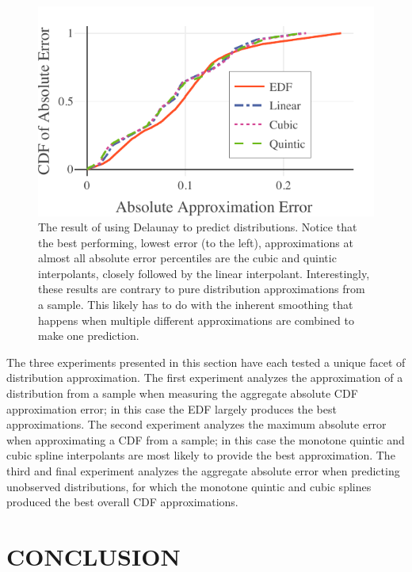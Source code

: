 \documentclass[letterpaper, 10 pt, conference]{ieeeconf}  %
\begin{document}
\begin{figure}
  \vspace{-.3cm}
  \includegraphics[width=.5\textwidth]{delaunay-predictions.pdf}
  \caption{The result of using Delaunay to predict distributions. Notice that the best performing, lowest error (to the left), approximations at almost all absolute error percentiles are the cubic and quintic interpolants, closely followed by the linear interpolant. Interestingly, these results are contrary to pure distribution approximations from a sample. This likely has to do with the inherent smoothing that happens when multiple different approximations are combined to make one prediction.
  \vspace{-.5cm}}
  \label{fig:delaunay-errors}
\end{figure}


The three experiments presented in this section have each tested a unique facet of distribution approximation. The first experiment analyzes the approximation of a distribution from a sample when measuring the aggregate absolute CDF approximation error; in this case the EDF largely produces the best approximations. The second experiment analyzes the maximum absolute error when approximating a CDF from a sample; in this case the monotone quintic and cubic spline interpolants are most likely to provide the best approximation. The third and final experiment analyzes the aggregate absolute error when predicting unobserved distributions, for which the monotone quintic and cubic splines produced the best overall CDF approximations.




\section{CONCLUSION}
\label{sec:conclusion}
\end{document}
